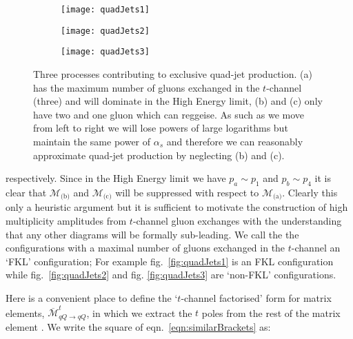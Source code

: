 		\begin{figure}[bt]

			\centering

			\begin{subfigure}[b]{0.31\textwidth}
				\texttt{[image: quadJets1]}
				\caption{}
				\label{fig:quadJets1}
			\end{subfigure}
			\begin{subfigure}[b]{0.31\textwidth}
				\texttt{[image: quadJets2]}
				\caption{}
				\label{fig:quadJets2}
			\end{subfigure}
			\begin{subfigure}[b]{0.31\textwidth}
				\texttt{[image: quadJets3]}
				\caption{}
				\label{fig:quadJets3}
			\end{subfigure}

			\caption{Three processes contributing to exclusive quad-jet production. (a) has the
			maximum number of gluons exchanged in the $t$-channel (three) and will dominate in the High
			Energy limit, (b) and (c) only have two and one gluon which can reggeise.  As such as we move
			from left to right we will lose powers of large logarithms but maintain the same power of
			$\alpha_s$ and therefore we can reasonably approximate quad-jet production by neglecting
			(b) and (c).}
			\label{fig:quadJets}
		\end{figure}

		respectively.  Since in the High
		Energy limit we have $p_a\sim p_1$ and $p_b\sim p_4$ it is clear that $\mathcal{M}_{\text{(b)}}$
		and $\mathcal{M}_{\text{(c)}}$ will be suppressed with respect to $\mathcal{M}_{\text{(a)}}$.
		Clearly this only a heuristic argument but it is sufficient to motivate the construction of
		high multiplicity amplitudes from $t$-channel gluon exchanges with the understanding that any
		other diagrams will be formally sub-leading.  We call the the configurations with a maximal
		number of gluons exchanged in the $t$-channel an `FKL' configuration;  For example
		fig.~\eqref{fig:quadJets1} is an FKL configuration while fig.~\eqref{fig:quadJets2} and fig.
		\eqref{fig:quadJets3} are `non-FKL' configurations.

		Here is a convenient place to define the `$t$-channel factorised' form for matrix elements,
		$\overline{\mathcal{M}}^t_{qQ\rightarrow qQ}$, in which we extract the $t$ poles from the
		rest of the matrix element \cite{Andersen:2009nu}.  We write the square of
		eqn.~\eqref{eqn:similarBrackets} as:

